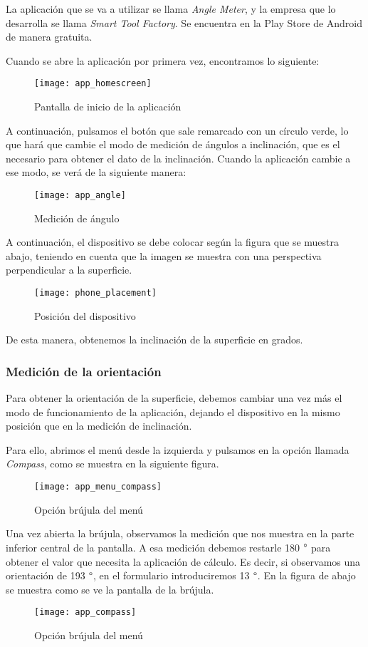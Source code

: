 La aplicación que se va a utilizar se llama \textit{Angle Meter}, y la empresa que lo desarrolla se llama \textit{Smart Tool Factory}. Se encuentra en la Play Store de Android de manera gratuita.

Cuando se abre la aplicación por primera vez, encontramos lo siguiente:

\begin{figure}[H]
\texttt{[image: app\_homescreen]}
\centering
\caption{Pantalla de inicio de la aplicación}
\end{figure}

A continuación, pulsamos el botón que sale remarcado con un círculo verde, lo que hará que cambie el modo de medición de ángulos a inclinación, que es el necesario para obtener el dato de la inclinación. Cuando la aplicación cambie a ese modo, se verá de la siguiente manera:

\begin{figure}[H]
\texttt{[image: app\_angle]}
\centering
\caption{Medición de ángulo}
\end{figure}

A continuación, el dispositivo se debe colocar según la figura que se muestra abajo, teniendo en cuenta que la imagen se muestra con una perspectiva perpendicular a la superficie.
\begin{figure}[H]
\texttt{[image: phone\_placement]}
\centering
\caption{Posición del dispositivo}
\end{figure}

De esta manera, obtenemos la inclinación de la superficie en grados.

\subsubsection{Medición de la orientación}

Para obtener la orientación de la superficie, debemos cambiar una vez más el modo de funcionamiento de la aplicación, dejando el dispositivo en la mismo posición que en la medición de inclinación.

Para ello, abrimos el menú desde la izquierda y pulsamos en la opción llamada \textit{Compass}, como se muestra en la siguiente figura.

\begin{figure}[H]
\texttt{[image: app\_menu\_compass]}
\centering
\caption{Opción brújula del menú}
\end{figure}

Una vez abierta la brújula, observamos la medición que nos muestra en la parte inferior central de la pantalla. A esa medición debemos restarle 180 $\degree$ para obtener el valor que necesita la aplicación de cálculo. Es decir, si observamos una orientación de 193 $\degree$, en el formulario introduciremos 13 $\degree$. En la figura de abajo se muestra como se ve la pantalla de la brújula.

\begin{figure}[H]
\texttt{[image: app\_compass]}
\centering
\caption{Opción brújula del menú}
\end{figure}

